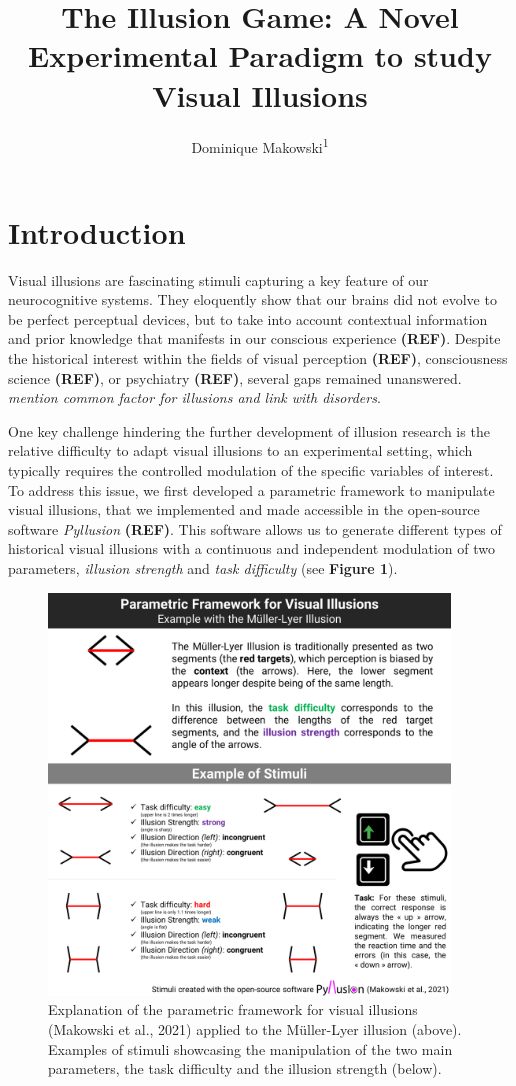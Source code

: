 \documentclass[
  man,floatsintext]{apa6}
\title{\textbf{The Illusion Game: A Novel Experimental Paradigm to study Visual Illusions}}
\author{Dominique Makowski\textsuperscript{1}}
\date{}
\affiliation{\vspace{0.5cm}\textsuperscript{1} School of Social Sciences, Nanyang Technological University, Singapore}
\begin{document}
\maketitle

\hypertarget{introduction}{%
\section{Introduction}\label{introduction}}

Visual illusions are fascinating stimuli capturing a key feature of our neurocognitive systems. They eloquently show that our brains did not evolve to be perfect perceptual devices, but to take into account contextual information and prior knowledge that manifests in our conscious experience \textbf{(REF)}. Despite the historical interest within the fields of visual perception \textbf{(REF)}, consciousness science \textbf{(REF)}, or psychiatry \textbf{(REF)}, several gaps remained unanswered. \emph{mention common factor for illusions and link with disorders}.

One key challenge hindering the further development of illusion research is the relative difficulty to adapt visual illusions to an experimental setting, which typically requires the controlled modulation of the specific variables of interest. To address this issue, we first developed a parametric framework to manipulate visual illusions, that we implemented and made accessible in the open-source software \emph{Pyllusion} \textbf{(REF)}. This software allows us to generate different types of historical visual illusions with a continuous and independent modulation of two parameters, \emph{illusion strength} and \emph{task difficulty} (see \textbf{Figure 1}).

\begin{figure}
\includegraphics[width=4.2in]{figures/Figure1} \caption{Explanation of the parametric framework for visual illusions (Makowski et al., 2021) applied to the Müller-Lyer illusion (above). Examples of stimuli showcasing the manipulation of the two main parameters, the task difficulty and the illusion strength (below).}\label{fig:unnamed-chunk-2}
\end{figure}
\end{document}
